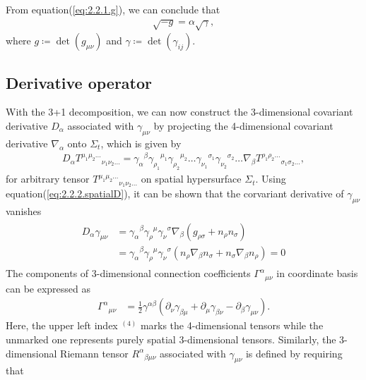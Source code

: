 From equation(\ref{eq:2.2.1.g}), we can conclude that
\begin{align}
    \sqrt{-g} = \alpha \sqrt{\gamma},
\end{align}
where $g \coloneqq \det{\left(g_{\mu\nu}\right)}$ and $\gamma \coloneqq \det{\left(\gamma_{ij}\right)}$.

\subsection{Derivative operator} \label{section2.2.2}
With the 3+1 decomposition, we can now construct the 3-dimensional covariant derivative $D_\alpha$ associated with $\gamma_{\mu\nu}$ by projecting the 4-dimensional covariant derivative $\nabla_\alpha$ onto $\Sigma_t$, which is given by
\begin{align}\label{eq:2.2.2.spatialD}
    D_{\alpha} T^{\mu_1 \mu_2 \dots}{}_{\nu_1 \nu_2 \dots} = \gamma_{\alpha}{}^{\beta}\gamma_{\rho_1}{}^{\mu_1} \gamma_{\rho_2}{}^{\mu_2} \dots \gamma_{\nu_1}{}^{\sigma_1} \gamma_{\nu_2}{}^{\sigma_2} \dots \nabla_{\beta} T^{\rho_1 \rho_2 \dots}{}_{\sigma_1 \sigma_2 \dots},
\end{align}
for arbitrary tensor $T^{\mu_1 \mu_2 \dots}{}_{\nu_1 \nu_2 \dots}$ on spatial hypersurface $\Sigma_t$.
Using equation(\ref{eq:2.2.2.spatialD}), it can be shown that the corvariant derivative of $\gamma_{\mu\nu}$ vanishes
\begin{align}
\begin{split}
    D_{\alpha} \gamma_{\mu\nu} &= \gamma_{\alpha}{}^{\beta} \gamma_{\rho}{}^{\mu} \gamma_{\nu}{}^{\sigma} \nabla_{\beta} \left(g_{\rho\sigma} + n_\rho n_\sigma \right) \\
    &= \gamma_{\alpha}{}^{\beta} \gamma_{\rho}{}^{\mu} \gamma_{\nu}{}^{\sigma} \left( n_\rho \nabla_\beta n_\sigma + n_\sigma \nabla_\beta n_\rho \right) = 0
\end{split}
\end{align}
The components of 3-dimensional connection coefficients $\Gamma^{\alpha}{}_{\mu\nu}$ in coordinate basis can be expressed as
\begin{align}\label{eq:3_connection}
    \Gamma^{\alpha}{}_{\mu\nu} &= \frac{1}{2} \gamma^{\alpha\beta} \left( \partial_{\nu}\gamma_{\beta\mu} + \partial_{\mu}\gamma_{\beta\nu} - \partial_{\beta}\gamma_{\mu\nu} \right).
\end{align}
Here, the upper left index ${}^{(4)}$ marks the 4-dimensional tensors while the unmarked one represents purely spatial 3-dimensional tensors.
Similarly, the 3-dimensional Riemann tensor $R^{\alpha}{}_{\beta\mu\nu}$ associated with $\gamma_{\mu\nu}$ is defined by requiring that
